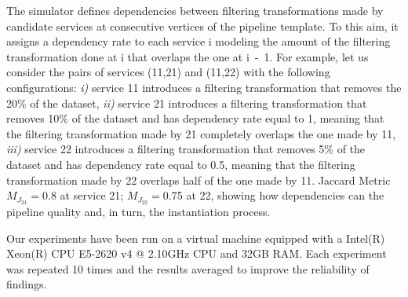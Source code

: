 The simulator defines dependencies between filtering transformations made by candidate services at consecutive vertices of the pipeline template.
To this aim, it assigns a dependency rate to each service \si{i} modeling the amount of the filtering transformation done at \si{i} that overlaps the one at \si{i-1}.
For example, let us consider the pairs of services (\si{11},\si{21}) and (\si{11},\si{22}) with the following configurations: \emph{i)} service \si{11} introduces a filtering transformation that removes the 20\% of the dataset, \emph{ii)} service \si{21} introduces a filtering transformation that removes 10\% of the dataset and has dependency rate equal to 1, meaning that the filtering transformation made by \si{21} completely overlaps the one made by \si{11}, \emph{iii)} service \si{22} introduces a filtering transformation that removes 5\% of the dataset and has dependency rate equal to 0.5, meaning that the filtering transformation made by \si{22} overlaps half of the one made by \si{11}. Jaccard Metric $M_{J_{21}}$$=$0.8 at service \si{21}; $M_{J_{22}}$$=$0.75 at \si{22}, showing how dependencies can the pipeline quality and, in turn, the instantiation process.

Our experiments have been run on a virtual machine equipped with a Intel(R) Xeon(R) CPU E5-2620 v4 @ 2.10GHz CPU and 32GB RAM.
Each experiment was repeated 10 times and the results averaged to improve the reliability of findings.

